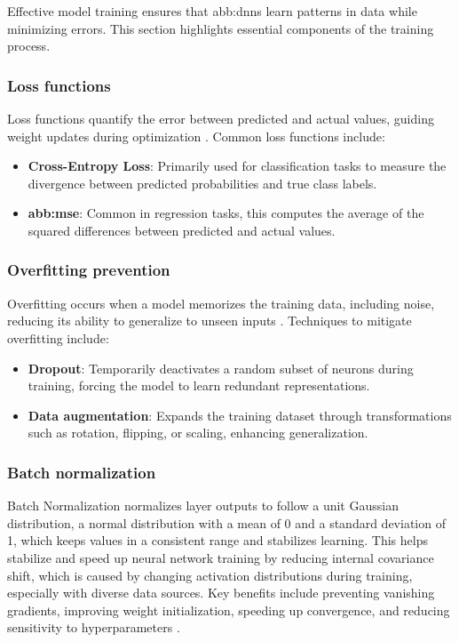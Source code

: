 Effective model training ensures that \gls{abb:dnn}s learn patterns in data while minimizing errors. This section highlights essential components of the training process.

\subsubsection{Loss functions}
Loss functions quantify the error between predicted and actual values, guiding weight updates during optimization \parencite{alzubaidi2021review}. Common loss functions include:
\begin{itemize}
    \item \textbf{Cross-Entropy Loss}: Primarily used for classification tasks to measure the divergence between predicted probabilities and true class labels.
    \item \textbf{\gls{abb:mse}}: Common in regression tasks, this computes the average of the squared differences between predicted and actual values.
\end{itemize}

\subsubsection{Overfitting prevention}
Overfitting occurs when a model memorizes the training data, including noise, reducing its ability to generalize to unseen inputs \parencite{alzubaidi2021review}. Techniques to mitigate overfitting include:
\begin{itemize}
    \item \textbf{Dropout}: Temporarily deactivates a random subset of neurons during training, forcing the model to learn redundant representations.
    \item \textbf{Data augmentation}: Expands the training dataset through transformations such as rotation, flipping, or scaling, enhancing generalization.
\end{itemize}

\subsubsection{Batch normalization}

Batch Normalization normalizes layer outputs to follow a unit Gaussian distribution, a normal distribution with a mean of 0 and a standard deviation of 1, which keeps values in a consistent range and stabilizes learning. This helps stabilize and speed up neural network training by reducing internal covariance shift, which is caused by changing activation distributions during training, especially with diverse data sources. Key benefits include preventing vanishing gradients, improving weight initialization, speeding up convergence, and reducing sensitivity to hyperparameters \parencite{alzubaidi2021review}.

